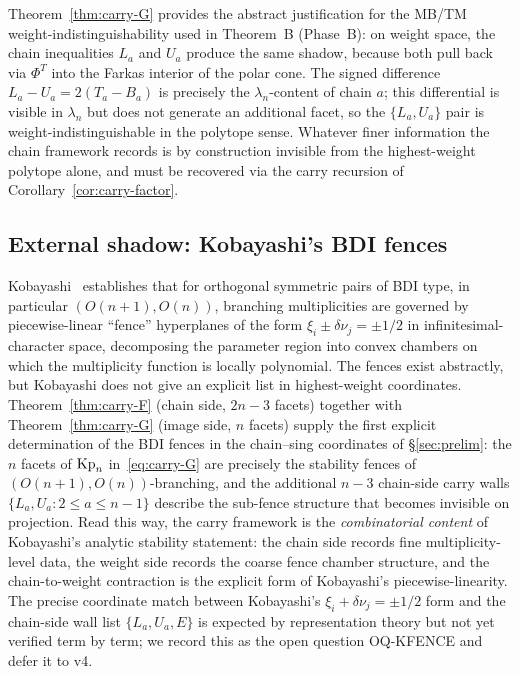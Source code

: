 \begin{remark}\label{rmk:weight-indistinguishability}
Theorem~\ref{thm:carry-G} provides the abstract justification for the
MB/TM weight-indistinguishability used in Theorem~B (Phase~B): on weight
space, the chain inequalities $L_a$ and $U_a$ produce the same shadow,
because both pull back via $\Phi^T$ into the Farkas interior of the polar
cone. The signed difference $L_a - U_a = 2(T_a - B_a)$ is precisely the
$\lambda_n$-content of chain $a$; this differential is visible in $\lambda_n$
but does not generate an additional facet, so the $\{L_a, U_a\}$ pair is
weight-indistinguishable in the polytope sense. Whatever finer information
the chain framework records is by construction invisible from the highest-weight
polytope alone, and must be recovered via the carry recursion of
Corollary~\ref{cor:carry-factor}.
\end{remark}

\subsection{External shadow: Kobayashi's BDI fences}\label{ssec:kobayashi-fences}

Kobayashi~\cite{Kobayashi2604} establishes that for orthogonal symmetric pairs
of BDI type, in particular $(O(n+1), O(n))$, branching multiplicities are
governed by piecewise-linear ``fence'' hyperplanes of the form
$\xi_i \pm \delta\nu_j = \pm 1/2$ in infinitesimal-character space, decomposing
the parameter region into convex chambers on which the multiplicity function is
locally polynomial. The fences exist abstractly, but Kobayashi does not give
an explicit list in highest-weight coordinates. Theorem~\ref{thm:carry-F}
(chain side, $2n - 3$ facets) together with Theorem~\ref{thm:carry-G}
(image side, $n$ facets) supply the first explicit determination of the BDI
fences in the chain--sing coordinates of \S\ref{sec:prelim}: the $n$ facets
of $\mathrm{Kp}_n$ in~\eqref{eq:carry-G} are precisely the stability fences of
$(O(n+1), O(n))$-branching, and the additional $n - 3$ chain-side carry walls
$\{L_a, U_a : 2 \le a \le n - 1\}$ describe the sub-fence structure that
becomes invisible on projection. Read this way, the carry framework is the
\emph{combinatorial content} of Kobayashi's analytic stability statement: the
chain side records fine multiplicity-level data, the weight side records the
coarse fence chamber structure, and the chain-to-weight contraction is the
explicit form of Kobayashi's piecewise-linearity. The precise coordinate
match between Kobayashi's $\xi_i + \delta\nu_j = \pm 1/2$ form and the
chain-side wall list $\{L_a, U_a, E\}$ is expected by representation theory but
not yet verified term by term; we record this as the open question OQ-KFENCE
and defer it to v4.

